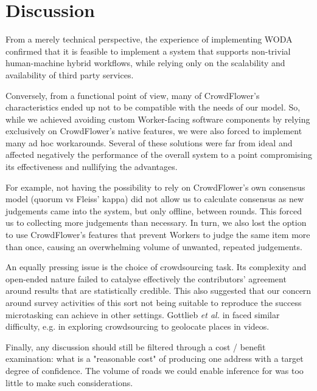 \section{Discussion}

From a merely technical perspective, the experience of implementing WODA confirmed that it is feasible to implement a system that supports non-trivial human-machine hybrid workflows, while relying only on the scalability and availability of third party services.

Conversely, from a functional point of view, many of CrowdFlower's characteristics ended up not to be compatible with the needs of our model. So, while we achieved avoiding custom Worker-facing software components by relying exclusively on CrowdFlower's native features, we were also forced to implement many ad hoc workarounds. Several of these solutions were far from ideal and affected negatively the performance of the overall system to a point compromising its effectiveness and nullifying the advantages. 

For example, not having the possibility to rely on CrowdFlower's own consensus model (quorum vs Fleiss' kappa) did not allow us to calculate consensus as new judgements came into the system, but only offline, between rounds. This forced us to collecting more judgements than necessary. In turn, we also lost the option to use CrowdFlower's features that prevent Workers to judge the same item more than once, causing an overwhelming volume of unwanted, repeated judgements. 

An equally pressing issue is the choice of crowdsourcing task. Its complexity and open-ended nature failed to catalyse effectively the contributors' agreement around results that are statistically credible. This also suggested that our concern around survey activities of this sort not being suitable to reproduce the success microtasking can achieve in other settings. Gottlieb {\it et al.} in \cite{Gottlieb:2012fh} faced similar difficulty, e.g. in exploring crowdsourcing to geolocate places in videos.

Finally, any discussion should still be filtered through a cost / benefit examination: what is a "reasonable cost" of producing one address with a target degree of confidence. The volume of roads we could enable inference for was too little to make such considerations.
